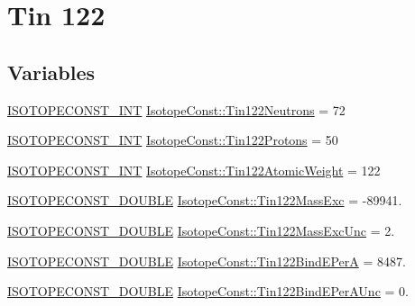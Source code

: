 \hypertarget{group___isotope_const-_tin-_sn122}{}\section{Tin 122}
\label{group___isotope_const-_tin-_sn122}
\subsection*{Variables}
\begin{DoxyCompactItemize}
\item 
\mbox{\hyperlink{group___isotope_const-_macros_ga5f18360b3e99483a35c32d789e62621c}{I\+S\+O\+T\+O\+P\+E\+C\+O\+N\+S\+T\+\_\+\+I\+NT}} \mbox{\hyperlink{group___isotope_const-_tin-_sn122_ga5accf23059bd80469f93cb356b5280df}{Isotope\+Const\+::\+Tin122\+Neutrons}} = 72
\item 
\mbox{\hyperlink{group___isotope_const-_macros_ga5f18360b3e99483a35c32d789e62621c}{I\+S\+O\+T\+O\+P\+E\+C\+O\+N\+S\+T\+\_\+\+I\+NT}} \mbox{\hyperlink{group___isotope_const-_tin-_sn122_ga64284a7193cac97e82b818882271f259}{Isotope\+Const\+::\+Tin122\+Protons}} = 50
\item 
\mbox{\hyperlink{group___isotope_const-_macros_ga5f18360b3e99483a35c32d789e62621c}{I\+S\+O\+T\+O\+P\+E\+C\+O\+N\+S\+T\+\_\+\+I\+NT}} \mbox{\hyperlink{group___isotope_const-_tin-_sn122_ga2683f2ee772de38bcb408c0a14703465}{Isotope\+Const\+::\+Tin122\+Atomic\+Weight}} = 122
\item 
\mbox{\hyperlink{group___isotope_const-_macros_ga8f45a7272ce02c0b4c65c44636ed719a}{I\+S\+O\+T\+O\+P\+E\+C\+O\+N\+S\+T\+\_\+\+D\+O\+U\+B\+LE}} \mbox{\hyperlink{group___isotope_const-_tin-_sn122_gaca3502328896553cdb59eba7357dd695}{Isotope\+Const\+::\+Tin122\+Mass\+Exc}} = -\/89941.
\item 
\mbox{\hyperlink{group___isotope_const-_macros_ga8f45a7272ce02c0b4c65c44636ed719a}{I\+S\+O\+T\+O\+P\+E\+C\+O\+N\+S\+T\+\_\+\+D\+O\+U\+B\+LE}} \mbox{\hyperlink{group___isotope_const-_tin-_sn122_gaad40ed718782509cf145548941b32eae}{Isotope\+Const\+::\+Tin122\+Mass\+Exc\+Unc}} = 2.
\item 
\mbox{\hyperlink{group___isotope_const-_macros_ga8f45a7272ce02c0b4c65c44636ed719a}{I\+S\+O\+T\+O\+P\+E\+C\+O\+N\+S\+T\+\_\+\+D\+O\+U\+B\+LE}} \mbox{\hyperlink{group___isotope_const-_tin-_sn122_ga149905eba2d7441faebabdab2bda523c}{Isotope\+Const\+::\+Tin122\+Bind\+E\+PerA}} = 8487.
\item 
\mbox{\hyperlink{group___isotope_const-_macros_ga8f45a7272ce02c0b4c65c44636ed719a}{I\+S\+O\+T\+O\+P\+E\+C\+O\+N\+S\+T\+\_\+\+D\+O\+U\+B\+LE}} \mbox{\hyperlink{group___isotope_const-_tin-_sn122_ga4decaf5c2b18d58e71c27935df229fbb}{Isotope\+Const\+::\+Tin122\+Bind\+E\+Per\+A\+Unc}} = 0.

\end{DoxyCompactItemize}
